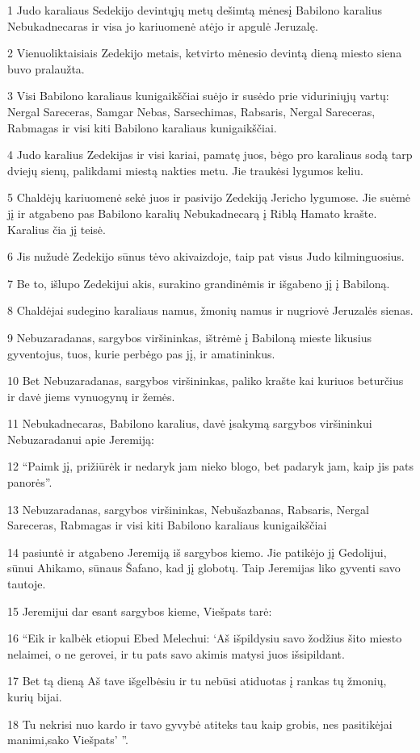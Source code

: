 \par 1 Judo karaliaus Sedekijo devintųjų metų dešimtą mėnesį Babilono karalius Nebukadnecaras ir visa jo kariuomenė atėjo ir apgulė Jeruzalę. 
\par 2 Vienuoliktaisiais Zedekijo metais, ketvirto mėnesio devintą dieną miesto siena buvo pralaužta. 
\par 3 Visi Babilono karaliaus kunigaikščiai suėjo ir susėdo prie viduriniųjų vartų: Nergal Sareceras, Samgar Nebas, Sarsechimas, Rabsaris, Nergal Sareceras, Rabmagas ir visi kiti Babilono karaliaus kunigaikščiai. 
\par 4 Judo karalius Zedekijas ir visi kariai, pamatę juos, bėgo pro karaliaus sodą tarp dviejų sienų, palikdami miestą nakties metu. Jie traukėsi lygumos keliu. 
\par 5 Chaldėjų kariuomenė sekė juos ir pasivijo Zedekiją Jericho lygumose. Jie suėmė jį ir atgabeno pas Babilono karalių Nebukadnecarą į Riblą Hamato krašte. Karalius čia jį teisė. 
\par 6 Jis nužudė Zedekijo sūnus tėvo akivaizdoje, taip pat visus Judo kilminguosius. 
\par 7 Be to, išlupo Zedekijui akis, surakino grandinėmis ir išgabeno jį į Babiloną. 
\par 8 Chaldėjai sudegino karaliaus namus, žmonių namus ir nugriovė Jeruzalės sienas. 
\par 9 Nebuzaradanas, sargybos viršininkas, ištrėmė į Babiloną mieste likusius gyventojus, tuos, kurie perbėgo pas jį, ir amatininkus. 
\par 10 Bet Nebuzaradanas, sargybos viršininkas, paliko krašte kai kuriuos beturčius ir davė jiems vynuogynų ir žemės. 
\par 11 Nebukadnecaras, Babilono karalius, davė įsakymą sargybos viršininkui Nebuzaradanui apie Jeremiją: 
\par 12 “Paimk jį, prižiūrėk ir nedaryk jam nieko blogo, bet padaryk jam, kaip jis pats panorės”. 
\par 13 Nebuzaradanas, sargybos viršininkas, Nebušazbanas, Rabsaris, Nergal Sareceras, Rabmagas ir visi kiti Babilono karaliaus kunigaikščiai 
\par 14 pasiuntė ir atgabeno Jeremiją iš sargybos kiemo. Jie patikėjo jį Gedolijui, sūnui Ahikamo, sūnaus Šafano, kad jį globotų. Taip Jeremijas liko gyventi savo tautoje. 
\par 15 Jeremijui dar esant sargybos kieme, Viešpats tarė: 
\par 16 “Eik ir kalbėk etiopui Ebed Melechui: ‘Aš išpildysiu savo žodžius šito miesto nelaimei, o ne gerovei, ir tu pats savo akimis matysi juos išsipildant. 
\par 17 Bet tą dieną Aš tave išgelbėsiu ir tu nebūsi atiduotas į rankas tų žmonių, kurių bijai. 
\par 18 Tu nekrisi nuo kardo ir tavo gyvybė atiteks tau kaip grobis, nes pasitikėjai manimi,­sako Viešpats’ ”.



